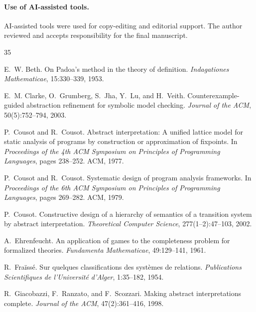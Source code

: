 \documentclass[pdflatex,sn-mathphys-num]{sn-jnl}
\theoremstyle{plain}
\theoremstyle{definition}
\theoremstyle{remark}
\begin{document}
\paragraph{Use of AI-assisted tools.}
AI-assisted tools were used for copy-editing and editorial support.
The author reviewed and accepts responsibility for the final manuscript.

\begin{thebibliography}{35}

E.~W. Beth.
\newblock On {P}adoa's method in the theory of definition.
\newblock \emph{Indagationes Mathematicae}, 15:330--339, 1953.

E.~M. Clarke, O.~Grumberg, S.~Jha, Y.~Lu, and H.~Veith.
\newblock Counterexample-guided abstraction refinement for symbolic model
  checking.
\newblock \emph{Journal of the {ACM}}, 50(5):752--794, 2003.

P.~Cousot and R.~Cousot.
\newblock Abstract interpretation: A unified lattice model for static analysis
  of programs by construction or approximation of fixpoints.
\newblock In \emph{Proceedings of the 4th {ACM} Symposium on Principles of
  Programming Languages}, pages 238--252. {ACM}, 1977.

P.~Cousot and R.~Cousot.
\newblock Systematic design of program analysis frameworks.
\newblock In \emph{Proceedings of the 6th {ACM} Symposium on Principles of
  Programming Languages}, pages 269--282. {ACM}, 1979.

P.~Cousot.
\newblock Constructive design of a hierarchy of semantics of a transition
  system by abstract interpretation.
\newblock \emph{Theoretical Computer Science}, 277(1--2):47--103, 2002.

A.~Ehrenfeucht.
\newblock An application of games to the completeness problem for formalized
  theories.
\newblock \emph{Fundamenta Mathematicae}, 49:129--141, 1961.

R.~Fra\"{i}ss\'{e}.
\newblock Sur quelques classifications des syst\`{e}mes de relations.
\newblock \emph{Publications Scientifiques de l'Universit\'{e} d'Alger},
  1:35--182, 1954.

R.~Giacobazzi, F.~Ranzato, and F.~Scozzari.
\newblock Making abstract interpretations complete.
\newblock \emph{Journal of the {ACM}}, 47(2):361--416, 1998.


\end{thebibliography}
\end{document}
